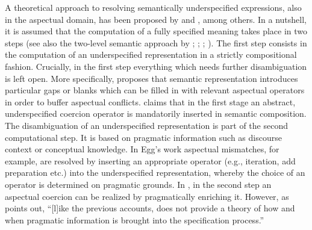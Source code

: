 \documentclass[output=paper]{langscibook}
\begin{document}
A theoretical approach to resolving semantically underspecified expressions, also in the aspectual domain, has been proposed by \citet{Dolling1995, Dolling1997, Dolling2001, Dolling2003b,Dolling2003a, Dolling2014} and \citet{Egg2005}, among others.  In a nutshell, it is assumed that the computation of a fully specified meaning takes place in two steps (see also the two-level semantic approach by \citealt{Bierwisch1983, Bierwisch1997, Bierwisch2007}; \citealt{BierwishandLang1989}; \citealt{BierwischandSchreuder1992}; \citealt{Lang1994}). The first step consists in the computation of an underspecified representation in a strictly compositional fashion. Crucially, in the first step everything which needs further disambiguation is left open. More specifically, \citet{Egg2005} proposes that semantic representation introduces particular gaps or blanks which can be filled in with relevant aspectual operators in order to buffer aspectual conflicts. \citet{Dolling2014} claims that in the first stage an abstract, underspecified coercion operator is mandatorily inserted in semantic composition. The disambiguation of an underspecified representation is part of the second computational step. It is based on pragmatic information such as discourse context or conceptual knowledge. In Egg’s work aspectual mismatches, for example, are resolved by inserting an appropriate operator (e.g., iteration, add preparation etc.) into the underspecified representation, whereby the choice of an operator is determined on pragmatic grounds. In \citet{Dolling2014}, in the second step an aspectual coercion can be realized by pragmatically enriching it. However, as \citet[p. 47]{Bott2010} points out, “[l]ike the previous accounts, \citet{ Egg2005} does not provide a theory of how and when pragmatic information is brought into the specification process.” 
\end{document}
